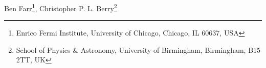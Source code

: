 Ben Farr\footnote{Enrico Fermi Institute, University of Chicago, Chicago, IL 60637, USA},
Christopher P. L. Berry\footnote{School of Physics & Astronomy, University of Birmingham, Birmingham, B15 2TT, UK}
    